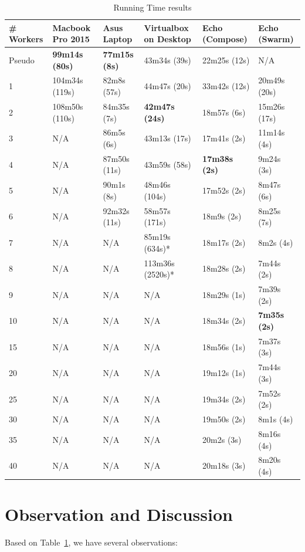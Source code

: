 \begin{table}[hbt]
\centering
\caption{Running Time results}\label{t:results-table}
	\begin{tabular}{llllll}
		\toprule
		\# Workers & Macbook Pro 2015 & Asus Laptop & Virtualbox on 
		Desktop & Echo (Compose) & Echo (Swarm) \\ \midrule
		Pseudo & \textbf{99m14s (80s)} & \textbf{77m15s (8s)} & 43m34s 
		(39s) & 22m25s (12s) & N/A \\\midrule
		1 & 104m34s (119s) & 82m8s (57s) & 44m47s (20s) & 33m42s (12s) & 
		20m49s (20s) \\\midrule
		2 & 108m50s (110s) & 84m35s (7s) & \textbf{42m47s (24s)} & 18m57s 
		(6s) & 15m26s (17s) \\\midrule
		3 & N/A & 86m5s (6s) & 43m13s (17s) & 17m41s (2s) & 11m14s (4s) 
		\\\midrule
		4 & N/A & 87m50s (11s) & 43m59s (58s) & \textbf{17m38s (2s)} & 
		9m24s (3s) \\\midrule
		5 & N/A & 90m1s (8s) & 48m46s (104s) & 17m52s (2s) & 8m47s (6s) 
		\\\midrule
		6 & N/A & 92m32s (11s) & 58m57s (171s) & 18m9s (2s) & 8m25s (7s) 
		\\\midrule
		7 & N/A & N/A & 85m19s (634s)* & 18m17s (2s) & 8m2s (4s) \\\midrule
		8 & N/A & N/A & 113m36s (2520s)* & 18m28s (2s) & 7m44s (2s) 
		\\\midrule
		9 & N/A & N/A & N/A & 18m29s (1s) & 7m39s (2s) \\\midrule
		10 & N/A & N/A & N/A & 18m34s (2s) & \textbf{7m35s (2s)} \\\midrule
		15 & N/A & N/A & N/A & 18m56s (1s) & 7m37s (3s) \\\midrule
		20 & N/A & N/A & N/A & 19m12s (1s) & 7m44s (3s) \\\midrule
		25 & N/A & N/A & N/A & 19m34s (2s) & 7m52s (2s) \\\midrule
		30 & N/A & N/A & N/A & 19m50s (2s) & 8m1s (4s) \\\midrule
		35 & N/A & N/A & N/A & 20m2s (3s) & 8m16s (4s) \\\midrule
		40 & N/A & N/A & N/A & 20m18s (3s) & 8m20s (4s)\\\bottomrule
	\end{tabular}
\end{table}

\section{Observation and Discussion}
Based on Table~\ref{t:results-table}, we have several observations: 

